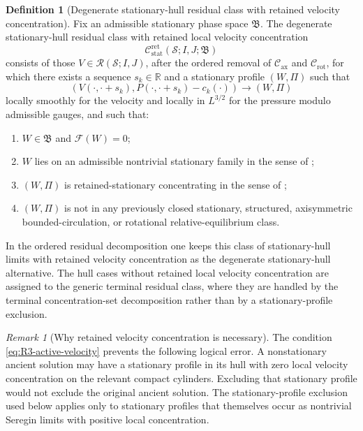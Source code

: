 \documentclass[11pt]{amsart}
\numberwithin{equation}{section}
\theoremstyle{plain}
\theoremstyle{definition}
\newtheorem{definition}[definition]{Definition}
\theoremstyle{remark}
\newtheorem{remark}[remark]{Remark}
\newcommand{\Cax}{\mathcal C_{\mathrm{ax}}}
\newcommand{\Crot}{\mathcal C_{\mathrm{rot}}}
\newcommand{\Cstat}{\mathcal C_{\mathrm{stat}}^{\mathrm{ret}}}
\begin{document}
\begin{definition}[Degenerate stationary-hull residual class with retained velocity concentration]
\label{def:R3-active-class}
Fix an admissible stationary phase space \(\mathfrak B\).  The degenerate
stationary-hull residual class with retained local velocity concentration
\[
   \Cstat(\mathcal S;I,J;\mathfrak B)
\]
consists of those \(V\in\mathcal R(\mathcal S;I,J)\), after the ordered
removal of \(\Cax\) and \(\Crot\), for which there exists a
sequence \(s_k\in\mathbb R\) and a stationary profile \((W,\Pi)\) such that
\begin{equation}\label{eq:R3-hull-convergence}
   (V(\cdot,\cdot+s_k),P(\cdot,\cdot+s_k)-c_k(\cdot))
   \longrightarrow (W,\Pi)
\end{equation}
locally smoothly for the velocity and locally in \(L^{3/2}\) for the pressure
modulo admissible gauges, and such that:
\begin{enumerate}[label=(\roman*)]
   \item \(W\in\mathfrak B\) and \(\mathcal F(W)=0\);
   \item \(W\) lies on an admissible nontrivial stationary family in the sense
      of ;
   \item \((W,\Pi)\) is retained-stationary concentrating in the sense of
      ;
   \item \((W,\Pi)\) is not in any previously closed stationary, structured,
      axisymmetric bounded-circulation, or rotational relative-equilibrium
      class.
\end{enumerate}
In the ordered residual decomposition one keeps this class of stationary-hull
limits with retained velocity concentration as the degenerate stationary-hull
alternative.  The hull cases
without retained local velocity concentration
are assigned to the generic terminal residual class, where they are
handled by the terminal concentration-set decomposition rather than by a
stationary-profile exclusion.
\end{definition}

\begin{remark}[Why retained velocity concentration is necessary]
\label{rem:R3-active-necessary}
The condition \eqref{eq:R3-active-velocity} prevents the following logical error.  A
nonstationary ancient solution may have a stationary profile in its hull with
zero local velocity concentration on the relevant compact cylinders.  Excluding that stationary
profile would not exclude the original ancient solution.  The
stationary-profile exclusion used below applies only to stationary profiles
that themselves occur as nontrivial Seregin limits with positive local
concentration.
\end{remark}
\end{document}
